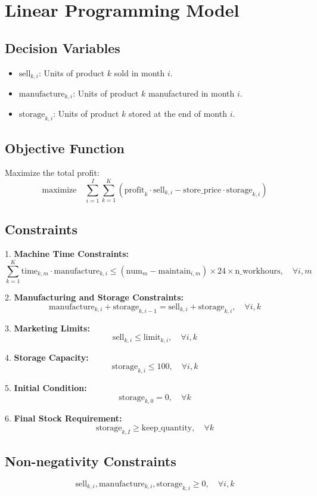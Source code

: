 \documentclass{article}
\begin{document}
\section*{Linear Programming Model}

\subsection*{Decision Variables}
\begin{itemize}
    \item $\text{sell}_{k,i}$: Units of product $k$ sold in month $i$.
    \item $\text{manufacture}_{k,i}$: Units of product $k$ manufactured in month $i$.
    \item $\text{storage}_{k,i}$: Units of product $k$ stored at the end of month $i$.
\end{itemize}

\subsection*{Objective Function}
Maximize the total profit:
\[
\text{maximize} \quad \sum_{i=1}^{I} \sum_{k=1}^{K} \left( \text{profit}_k \cdot \text{sell}_{k,i} - \text{store\_price} \cdot \text{storage}_{k,i} \right)
\]

\subsection*{Constraints}
1. \textbf{Machine Time Constraints:}
\[
\sum_{k=1}^{K} \text{time}_{k,m} \cdot \text{manufacture}_{k,i} \leq (\text{num}_{m} - \text{maintain}_{i,m}) \times 24 \times \text{n\_workhours}, \quad \forall i, m
\]

2. \textbf{Manufacturing and Storage Constraints:}
\[
\text{manufacture}_{k,i} + \text{storage}_{k,i-1} = \text{sell}_{k,i} + \text{storage}_{k,i}, \quad \forall i, k
\]

3. \textbf{Marketing Limits:}
\[
\text{sell}_{k,i} \leq \text{limit}_{k,i}, \quad \forall i, k
\]

4. \textbf{Storage Capacity:}
\[
\text{storage}_{k,i} \leq 100, \quad \forall i, k
\]

5. \textbf{Initial Condition:}
\[
\text{storage}_{k,0} = 0, \quad \forall k
\]

6. \textbf{Final Stock Requirement:}
\[
\text{storage}_{k,I} \geq \text{keep\_quantity}, \quad \forall k
\]

\subsection*{Non-negativity Constraints}
\[
\text{sell}_{k,i}, \text{manufacture}_{k,i}, \text{storage}_{k,i} \geq 0, \quad \forall i, k
\]
\end{document}
